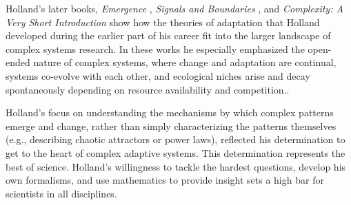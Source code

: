 \documentclass{sig-alternate}
\begin{document}





Holland's later books, \emph{Emergence} \cite{Holland2000},
\emph{Signals and Boundaries} \cite{Holland2012}, and
\emph{Complexity: A Very Short Introduction} \cite{Holland2014} show how the
theories of adaptation that Holland developed during the earlier part
of his career fit into the larger landscape of complex systems
research.  In these works he especially emphasized the open-ended
nature of complex systems, where change and adaptation are
continual, systems co-evolve with each other, and ecological niches arise
and decay spontaneously depending on resource availability and competition..


Holland's focus on understanding the mechanisms by which complex patterns emerge and change,
rather than simply characterizing the patterns themselves (e.g.,
describing chaotic attractors or power laws), reflected his
determination to get to the heart of complex adaptive systems.
This determination represents the best of science.  Holland's
willingness to tackle the hardest questions, develop his own
formalisms, and use mathematics to provide insight sets a high bar for
scientists in all disciplines.
\end{document}
